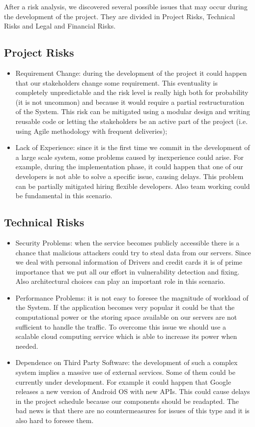 After a risk analysis, we discovered several possible issues that may occur during the development of the project. They are divided in Project Risks, Technical Risks and Legal and Financial Risks.

\subsection{Project Risks}
\begin{itemize}
\item Requirement Change: during the development of the project it could happen that our stakeholders change some requirement. This eventuality is completely unpredictable and the risk level is really high both for probability (it is not uncommon) and because it would require a partial restructuration of the System. This risk can be mitigated using a modular design and writing reusable code or letting the stakeholders be an active part of the project (i.e. using Agile methodology with frequent deliveries);
\item Lack of Experience: since it is the first time we commit in the development of a large scale system, some problems caused by inexperience could arise. For example, during the implementation phase, it could happen that one of our developers is not able to solve a specific issue, causing delays. This problem can be partially mitigated hiring flexible developers. Also team working could be fundamental in this scenario.
\end{itemize}
\subsection{Technical Risks}
\begin{itemize}
\item Security Problems: when the service becomes publicly accessible there is a chance that malicious attackers could try to steal data from our servers. Since we deal with personal information of Drivers and credit cards it is of prime importance that we put all our effort in vulnerability detection and fixing. Also architectural choices can play an important role in this scenario. 
\item Performance Problems: it is not easy to foresee the magnitude of workload of the System. If the application becomes very popular it could be that the computational power or the storing space available on our servers are not sufficient to handle the traffic. To overcome this issue we should use a scalable cloud computing service which is able to increase its power when needed.
\item Dependence on Third Party Software: the development of such a complex system implies a massive use of external services. Some of them could be currently under development. For example it could happen that Google releases a new version of Android OS with new APIs. This could cause delays in the project schedule because our components should be readapted. The bad news is that there are no countermeasures for issues of this type and it is also hard to foresee them.
\end{itemize}

